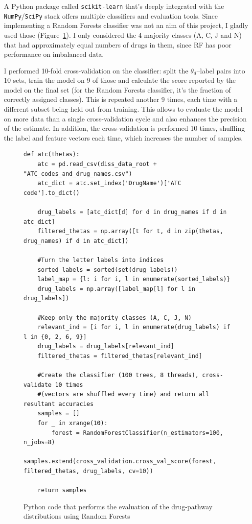 \documentclass[12pt,a4paper,twoside,openright]{report}
\begin{document}
A Python package called \texttt{scikit-learn} \cite{scikit-learn} that's deeply integrated with the \texttt{NumPy}/\texttt{SciPy} stack offers multiple classifiers and evaluation tools. Since implementing a Random Forests classifier was not an aim of this project, I gladly used those (Figure~\ref{fig:atc-python}). I only considered the 4 majority classes (A, C, J and N) that had approximately equal numbers of drugs in them, since RF has poor performance on imbalanced data.

I performed 10-fold cross-validation on the classifier: split the $\theta_d$--label pairs into 10 sets, train the model on 9 of those and calculate the score reported by the model on the final set (for the Random Forests classifier, it's the fraction of correctly assigned classes). This is repeated another 9 times, each time with a different subset being held out from training. This allows to evaluate the model on more data than a single cross-validation cycle and also enhances the precision of the estimate. In addition, the cross-validation is performed 10 times, shuffling the label and feature vectors each time, which increases the number of samples.

\begin{figure}
\begin{Verbatim}[fontsize=\scriptsize]
def atc(thetas):
    atc = pd.read_csv(diss_data_root + "ATC_codes_and_drug_names.csv")
    atc_dict = atc.set_index('DrugName')['ATC code'].to_dict()
    
    drug_labels = [atc_dict[d] for d in drug_names if d in atc_dict]
    filtered_thetas = np.array([t for t, d in zip(thetas, drug_names) if d in atc_dict])
    
    #Turn the letter labels into indices
    sorted_labels = sorted(set(drug_labels))
    label_map = {l: i for i, l in enumerate(sorted_labels)}
    drug_labels = np.array([label_map[l] for l in drug_labels])
    
    #Keep only the majority classes (A, C, J, N)
    relevant_ind = [i for i, l in enumerate(drug_labels) if l in {0, 2, 6, 9}]
    drug_labels = drug_labels[relevant_ind]
    filtered_thetas = filtered_thetas[relevant_ind]

    #Create the classifier (100 trees, 8 threads), cross-validate 10 times
    #(vectors are shuffled every time) and return all resultant accuracies
    samples = []
    for _ in xrange(10):
        forest = RandomForestClassifier(n_estimators=100, n_jobs=8)
        samples.extend(cross_validation.cross_val_score(forest, filtered_thetas, drug_labels, cv=10))
    
    return samples
\end{Verbatim}
\caption{Python code that performs the evaluation of the drug-pathway distributions using Random Forests}
\label{fig:atc-python}
\end{figure}
\end{document}
